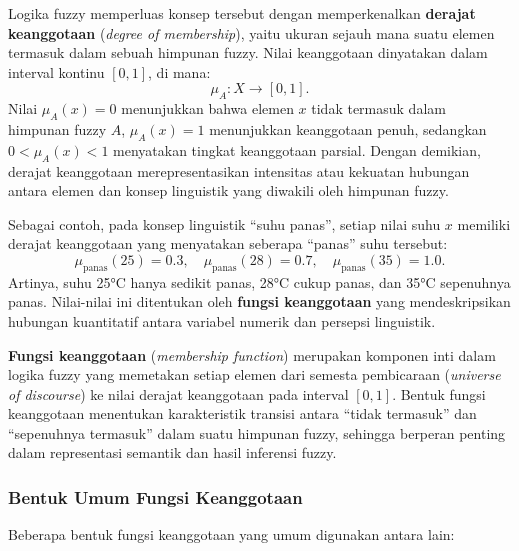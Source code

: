 \documentclass[12pt,a4paper]{article}
\theoremstyle{remark}
\begin{document}
Logika fuzzy memperluas konsep tersebut dengan memperkenalkan \textbf{derajat keanggotaan} (\textit{degree of membership}), yaitu ukuran sejauh mana suatu elemen termasuk dalam sebuah himpunan fuzzy. Nilai keanggotaan dinyatakan dalam interval kontinu \([0,1]\), di mana:
\[
    \mu_A: X \rightarrow [0,1].
\]
Nilai \(\mu_A(x)=0\) menunjukkan bahwa elemen \(x\) tidak termasuk dalam himpunan fuzzy \(A\), \(\mu_A(x)=1\) menunjukkan keanggotaan penuh, sedangkan \(0 < \mu_A(x) < 1\) menyatakan tingkat keanggotaan parsial. Dengan demikian, derajat keanggotaan merepresentasikan intensitas atau kekuatan hubungan antara elemen dan konsep linguistik yang diwakili oleh himpunan fuzzy.

Sebagai contoh, pada konsep linguistik “suhu panas”, setiap nilai suhu \(x\) memiliki derajat keanggotaan yang menyatakan seberapa “panas” suhu tersebut:
\[
    \mu_{\text{panas}}(25) = 0.3, \quad
    \mu_{\text{panas}}(28) = 0.7, \quad
    \mu_{\text{panas}}(35) = 1.0.
\]
Artinya, suhu 25°C hanya sedikit panas, 28°C cukup panas, dan 35°C sepenuhnya panas. Nilai-nilai ini ditentukan oleh \textbf{fungsi keanggotaan} yang mendeskripsikan hubungan kuantitatif antara variabel numerik dan persepsi linguistik.

\textbf{Fungsi keanggotaan} (\textit{membership function}) merupakan komponen inti dalam logika fuzzy yang memetakan setiap elemen dari semesta pembicaraan (\textit{universe of discourse}) ke nilai derajat keanggotaan pada interval \([0,1]\). Bentuk fungsi keanggotaan menentukan karakteristik transisi antara “tidak termasuk” dan “sepenuhnya termasuk” dalam suatu himpunan fuzzy, sehingga berperan penting dalam representasi semantik dan hasil inferensi fuzzy.

\subsubsection{Bentuk Umum Fungsi Keanggotaan}

Beberapa bentuk fungsi keanggotaan yang umum digunakan antara lain:
\end{document}
